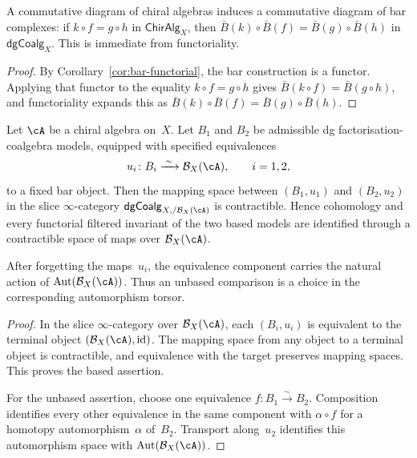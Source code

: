 \begin{corollary}\label{cor:bar-natural}
\label{cor:why-functoriality}
A commutative diagram of chiral algebras induces a commutative diagram of bar complexes: if $k \circ f = g \circ h$ in $\mathsf{ChirAlg}_X$, then $\bar{B}(k) \circ \bar{B}(f) = \bar{B}(g) \circ \bar{B}(h)$ in $\mathsf{dgCoalg}_X$. This is immediate from functoriality.
\end{corollary}

\begin{proof}
By Corollary~\ref{cor:bar-functorial}, the bar construction is a
functor. Applying that functor to the equality
$k \circ f = g \circ h$ gives
$\bar{B}(k \circ f) = \bar{B}(g \circ h)$, and functoriality expands
this as
$\bar{B}(k)\circ\bar{B}(f) = \bar{B}(g)\circ\bar{B}(h)$.
\end{proof}

\begin{proposition}
\label{prop:model-independence}
Let $\cA$ be a chiral algebra on~$X$.
Let $B_1$ and $B_2$ be admissible dg factorisation-coalgebra models,
equipped with specified equivalences
\[
 u_i\colon B_i\xrightarrow{\;\sim\;}\mathcal B_X(\cA),
 \qquad i=1,2,
\]
to a fixed bar object.  Then the mapping space between
$(B_1,u_1)$ and $(B_2,u_2)$ in the slice
$\infty$-category
$\mathsf{dgCoalg}_{X,/\mathcal B_X(\cA)}$ is contractible.  Hence
cohomology and every functorial filtered invariant of the two based
models are identified through a contractible space of maps over
$\mathcal B_X(\cA)$.

After forgetting the maps~$u_i$, the equivalence component carries the
natural action of
$\operatorname{Aut}(\mathcal B_X(\cA))$.  Thus an unbased comparison
is a choice in the corresponding automorphism torsor.
\end{proposition}

\begin{proof}
In the slice $\infty$-category over $\mathcal B_X(\cA)$, each
$(B_i,u_i)$ is equivalent to the terminal object
$(\mathcal B_X(\cA),\mathrm{id})$.  The mapping space from any object
to a terminal object is contractible, and equivalence with the target
preserves mapping spaces.  This proves the based assertion.

For the unbased assertion, choose one equivalence
$f\colon B_1\xrightarrow{\sim}B_2$.  Composition identifies every
other equivalence in the same component with
$\alpha\circ f$ for a homotopy automorphism~$\alpha$ of~$B_2$.
Transport along~$u_2$ identifies this automorphism space with
$\operatorname{Aut}(\mathcal B_X(\cA))$.
\end{proof}

